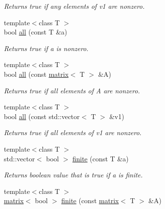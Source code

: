 \begin{DoxyCompactItemize}
\begin{DoxyCompactList}\small\item\em Returns true if any elements of v1 are nonzero. \end{DoxyCompactList}\item 
\hypertarget{namespacekeycpp_aab77d82d9cc7d1fcca87967048f09e0e}{{\footnotesize template$<$class T $>$ }\\bool \hyperlink{namespacekeycpp_aab77d82d9cc7d1fcca87967048f09e0e}{all} (const T \&a)}\label{namespacekeycpp_aab77d82d9cc7d1fcca87967048f09e0e}

\begin{DoxyCompactList}\small\item\em Returns true if a is nonzero. \end{DoxyCompactList}\item 
\hypertarget{namespacekeycpp_a0ebd51ca90981278382a922c04ee7a75}{{\footnotesize template$<$class T $>$ }\\bool \hyperlink{namespacekeycpp_a0ebd51ca90981278382a922c04ee7a75}{all} (const \hyperlink{classkeycpp_1_1matrix}{matrix}$<$ T $>$ \&A)}\label{namespacekeycpp_a0ebd51ca90981278382a922c04ee7a75}

\begin{DoxyCompactList}\small\item\em Returns true if all elements of A are nonzero. \end{DoxyCompactList}\item 
\hypertarget{namespacekeycpp_adcb91abe9a1d64046037bced47b7b466}{{\footnotesize template$<$class T $>$ }\\bool \hyperlink{namespacekeycpp_adcb91abe9a1d64046037bced47b7b466}{all} (const std\-::vector$<$ T $>$ \&v1)}\label{namespacekeycpp_adcb91abe9a1d64046037bced47b7b466}

\begin{DoxyCompactList}\small\item\em Returns true if all elements of v1 are nonzero. \end{DoxyCompactList}\item 
\hypertarget{namespacekeycpp_a03069647e77ae29e5437553b98274634}{{\footnotesize template$<$class T $>$ }\\std\-::vector$<$ bool $>$ \hyperlink{namespacekeycpp_a03069647e77ae29e5437553b98274634}{finite} (const T \&a)}\label{namespacekeycpp_a03069647e77ae29e5437553b98274634}

\begin{DoxyCompactList}\small\item\em Returns boolean value that is true if a is finite. \end{DoxyCompactList}\item 
\hypertarget{namespacekeycpp_a8879482fc9af1a809453e1719948263b}{{\footnotesize template$<$class T $>$ }\\\hyperlink{classkeycpp_1_1matrix}{matrix}$<$ bool $>$ \hyperlink{namespacekeycpp_a8879482fc9af1a809453e1719948263b}{finite} (const \hyperlink{classkeycpp_1_1matrix}{matrix}$<$ T $>$ \&A)}\label{namespacekeycpp_a8879482fc9af1a809453e1719948263b}


\end{DoxyCompactItemize}
